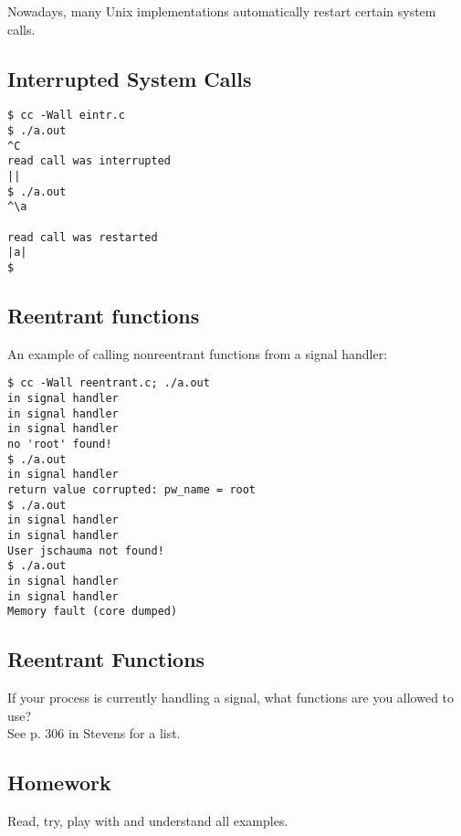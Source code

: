 \documentclass[xga]{xdvislides}
\begin{document}
Nowadays, many Unix implementations automatically restart certain system
calls.

\subsection{Interrupted System Calls}
\begin{verbatim}
$ cc -Wall eintr.c
$ ./a.out
^C
read call was interrupted
||
$ ./a.out
^\a

read call was restarted
|a|
$
\end{verbatim}

\subsection{Reentrant functions}
An example of calling nonreentrant functions from a signal handler:
\begin{verbatim}
$ cc -Wall reentrant.c; ./a.out
in signal handler
in signal handler
in signal handler
no 'root' found!
$ ./a.out
in signal handler
return value corrupted: pw_name = root
$ ./a.out
in signal handler
in signal handler
User jschauma not found!
$ ./a.out
in signal handler
in signal handler
Memory fault (core dumped)
\end{verbatim}

\subsection{Reentrant Functions}

If your process is currently handling a signal, what functions are you allowed
to use? \\

See p. 306 in Stevens for a list.


\subsection{Homework}

Read, try, play with and understand all examples. \\
\end{document}
